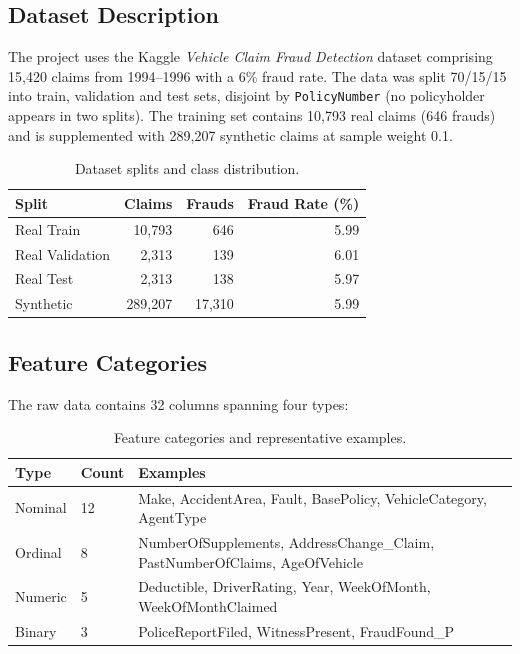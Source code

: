 \documentclass[12pt,a4paper]{article}
\begin{document}
\subsection{Dataset Description}

The project uses the Kaggle \textit{Vehicle Claim Fraud Detection} dataset comprising 15,420 claims from 1994--1996 with a 6\% fraud rate.  The data was split 70/15/15 into train, validation and test sets, disjoint by \texttt{PolicyNumber} (no policyholder appears in two splits).  The training set contains 10,793 real claims (646 frauds) and is supplemented with 289,207 synthetic claims at sample weight 0.1.

\begin{table}[H]
\centering
\caption{Dataset splits and class distribution.}
\label{tab:splits}
\begin{tabular}{@{}lrrr@{}}
\toprule
\textbf{Split} & \textbf{Claims} & \textbf{Frauds} & \textbf{Fraud Rate (\%)} \\
\midrule
Real Train       & 10,793  & 646   & 5.99 \\
Real Validation  & 2,313   & 139   & 6.01 \\
Real Test        & 2,313   & 138   & 5.97 \\
Synthetic        & 289,207 & 17,310 & 5.99 \\
\bottomrule
\end{tabular}
\end{table}

\subsection{Feature Categories}

The raw data contains 32 columns spanning four types:

\begin{table}[H]
\centering
\caption{Feature categories and representative examples.}
\label{tab:features}
\begin{tabular}{@{}llp{8cm}@{}}
\toprule
\textbf{Type} & \textbf{Count} & \textbf{Examples} \\
\midrule
Nominal   & 12 & Make, AccidentArea, Fault, BasePolicy, VehicleCategory, AgentType \\
Ordinal   & 8  & NumberOfSupplements, AddressChange\_Claim, PastNumberOfClaims, AgeOfVehicle \\
Numeric   & 5  & Deductible, DriverRating, Year, WeekOfMonth, WeekOfMonthClaimed \\
Binary    & 3  & PoliceReportFiled, WitnessPresent, FraudFound\_P \\
\bottomrule
\end{tabular}
\end{table}
\end{document}
